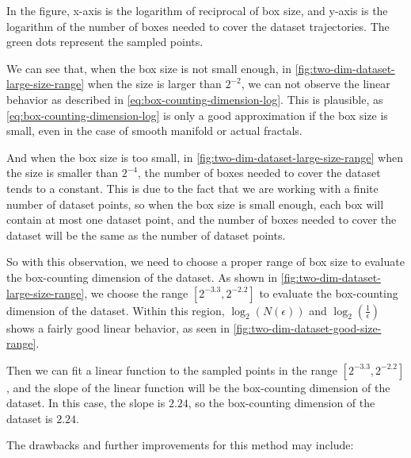 
In the figure, x-axis is the logarithm of reciprocal of box size, and y-axis is the logarithm of the number of boxes needed to cover the dataset trajectories.
The green dots represent the sampled points.

We can see that, when the box size is not small enough, in \cref{fig:two-dim-dataset-large-size-range} when the size is larger than $2^{-2}$, we can not observe the linear behavior as described in \cref{eq:box-counting-dimension-log}.
This is plausible, as \cref{eq:box-counting-dimension-log} is only a good approximation if the box size is small, even in the case of smooth manifold or actual fractals.

And when the box size is too small, in \cref{fig:two-dim-dataset-large-size-range} when the size is smaller than $2^{-4}$, the number of boxes needed to cover the dataset tends to a constant.
This is due to the fact that we are working with a finite number of dataset points, so when the box size is small enough, each box will contain at most one dataset point, and the number of boxes needed to cover the dataset will be the same as the number of dataset points.

So with this observation, we need to choose a proper range of box size to evaluate the box-counting dimension of the dataset.
As shown in \cref{fig:two-dim-dataset-large-size-range}, we choose the range $[2^{-3.3}, 2^{-2.2}]$ to evaluate the box-counting dimension of the dataset.
Within this region, $\log_2\left(N(\epsilon)\right)$ and $\log_2\left(\frac{1}{\epsilon}\right)$ shows a fairly good linear behavior, as seen in \cref{fig:two-dim-dataset-good-size-range}.


Then we can fit a linear function to the sampled points in the range $[2^{-3.3}, 2^{-2.2}]$, and the slope of the linear function will be the box-counting dimension of the dataset.
In this case, the slope is $2.24$, so the box-counting dimension of the dataset is $2.24$.

The drawbacks and further improvements for this method may include:

